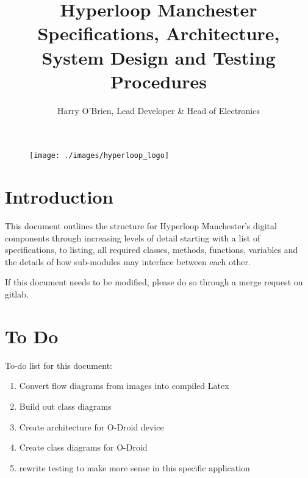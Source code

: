 \documentclass{article}
\title{Hyperloop Manchester Specifications, Architecture, System Design and Testing Procedures}
\author{Harry O'Brien, Lead Developer \& Head of Electronics}
\begin{document}
\maketitle

\begin{figure}[h!]
\centering
\texttt{[image: ./images/hyperloop\_logo]}
\end{figure}

\newpage

\tableofcontents

\newpage

\section{Introduction}
This document outlines the structure for Hyperloop Manchester's digital components through increasing levels of detail starting with a list of specifications, to listing, all required classes, methods, functions, variables and the details of how sub-modules may interface between each other.

If this document needs to be modified, please do so through a merge request on gitlab.









\section{To Do}
To-do list for this document:
\begin{enumerate}
    \item Convert flow diagrams from images into compiled Latex
    \item Build out class diagrams
    \item Create architecture for O-Droid device
    \item Create class diagrams for O-Droid
    \item rewrite testing to make more sense in this specific application
\end{enumerate}
\end{document}
